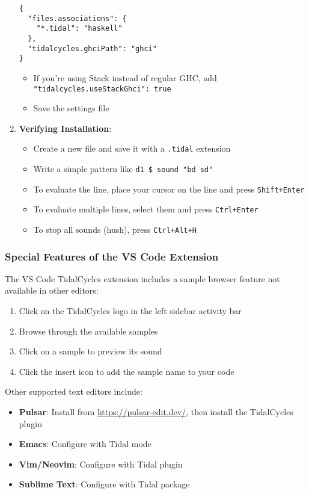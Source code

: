\documentclass[11pt,a4paper]{article}
\begin{document}
\begin{enumerate}
    \begin{lstlisting}[style=json]
{
  "files.associations": {
    "*.tidal": "haskell"
  },
  "tidalcycles.ghciPath": "ghci"
}
    \end{lstlisting}
   
    \begin{itemize}
        \item If you're using Stack instead of regular GHC, add \texttt{"tidalcycles.useStackGhci": true}
        \item Save the settings file
    \end{itemize}

    \item \textbf{Verifying Installation}:
    \begin{itemize}
        \item Create a new file and save it with a \texttt{.tidal} extension
        \item Write a simple pattern like \texttt{d1 \$ sound "bd sd"}
        \item To evaluate the line, place your cursor on the line and press \texttt{Shift+Enter}
        \item To evaluate multiple lines, select them and press \texttt{Ctrl+Enter}
        \item To stop all sounds (hush), press \texttt{Ctrl+Alt+H}
    \end{itemize}
\end{enumerate}

\subsubsection{Special Features of the VS Code Extension}

The VS Code TidalCycles extension includes a sample browser feature not available in other editors:

\begin{enumerate}
    \item Click on the TidalCycles logo in the left sidebar activity bar
    \item Browse through the available samples
    \item Click on a sample to preview its sound
    \item Click the insert icon to add the sample name to your code
\end{enumerate}

Other supported text editors include:

\begin{itemize}
    \item \textbf{Pulsar}: Install from \href{https://pulsar-edit.dev/}{https://pulsar-edit.dev/}, then install the TidalCycles plugin
    \item \textbf{Emacs}: Configure with Tidal mode
    \item \textbf{Vim/Neovim}: Configure with Tidal plugin
    \item \textbf{Sublime Text}: Configure with Tidal package
\end{itemize}
\end{document}
